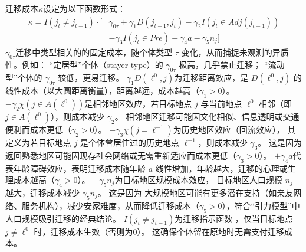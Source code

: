 \documentclass[a4paper,12pt,oneside]{book} %
\begin{document}
迁移成本$\kappa$设定为以下函数形式：
\begin{equation}
\begin{split}
  \kappa=I(j_t \neq j_{t-1}) \cdot [& 
  \gamma_{0 \tau}
  + \gamma_1 D(j_{t-1},j_t)
  - \gamma_2 I(j_t \in Adj(j_{t-1}))
  \\&
  - \gamma_3 I(j_t \in Pre)
  + \gamma_4 a
  -\gamma_5 n_j
  ]
\end{split}
\label{eq:迁移成本函数}
\end{equation}
$\gamma_{0\tau}$迁移中类型相关的的固定成本，随个体类型 $\tau$ 变化，从而捕捉未观测的异质性。例如：  
“定居型”个体（stayer type）的 $\gamma_{0\tau}$ 极高，几乎禁止迁移；
“流动型”个体的 $\gamma_{0\tau}$ 较低，更易迁移。
$\gamma_1 D(\ell^0, j)$为迁移距离效应，是 $D(\ell^0, j)$ 的线性成本（以大圆距离衡量），距离越远，成本越高（$\gamma_1 > 0$）。  
$-\gamma_2 \chi(j \in A(\ell^0))$是相邻地区效应，若目标地点 $j$ 与当前地点 $\ell^0$ 相邻（即 $j \in A(\ell^0)$），则成本减少 $\gamma_2$。
相邻地区迁移可能因文化相似、信息透明或交通便利而成本更低（$\gamma_2 > 0$）。  
$-\gamma_3 \chi(j = \ell^{-1})$为历史地区效应（回流效应），
其定义为若目标地点 $j$ 是个体曾居住过的历史地点 $\ell^{-1}$，则成本减少 $\gamma_3$。
这是因为返回熟悉地区可能因现存社会网络或无需重新适应而成本更低（$\gamma_3 > 0$）。  
$+\gamma_4 a$代表年龄障碍效应，表明迁移成本随年龄 $a$ 线性增加，年龄越大，迁移的心理或生理成本越高（$\gamma_4 > 0$）。  
$-\gamma_5 n_j$为目标地区规模成本效应，
目标地区人口规模 $n_j$ 越大，迁移成本减少 $\gamma_5 n_j$。  
这是因为
大规模地区可能有更多潜在支持（如亲友网络、服务机构），减少安家难度，从而降低迁移成本（$\gamma_5 > 0$），符合“引力模型”中人口规模吸引迁移的经典结论。  
$I(j_t \neq j_{t-1})$为迁移指示函数 ，仅当目标地点 $j \neq \ell^0$ 时，迁移成本生效（否则为0）。  这确保个体留在原地时无需支付迁移成本。
\end{document}
